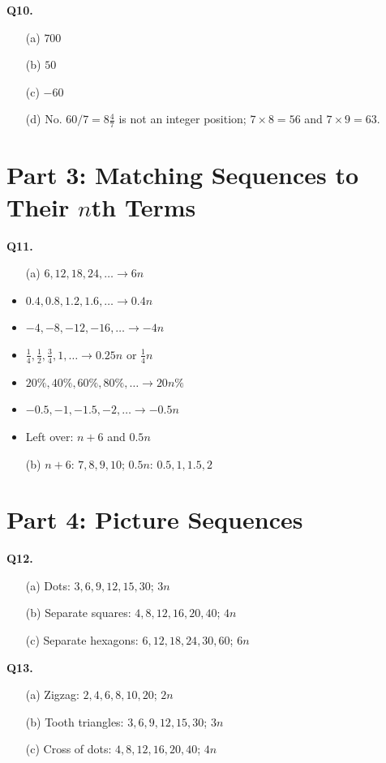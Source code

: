 \documentclass[11pt,a4paper]{article}
\begin{document}
\textbf{Q10.}
\begin{itemize}
\item[(a)] \(700\)
\item[(b)] \(50\)
\item[(c)] \(-60\)
\item[(d)] No. \(60/7=8\frac47\) is not an integer position; \(7\times8=56\) and \(7\times9=63\).
\end{itemize}

\section*{Part 3: Matching Sequences to Their \(n\)th Terms}

\textbf{Q11.}
\begin{itemize}
\item[(a)] \(6,12,18,24,\ldots\to 6n\)
\item \(0.4,0.8,1.2,1.6,\ldots\to 0.4n\)
\item \(-4,-8,-12,-16,\ldots\to -4n\)
\item \(\frac14,\frac12,\frac34,1,\ldots\to 0.25n\) or \(\frac14 n\)
\item \(20\%,40\%,60\%,80\%,\ldots\to 20n\%\)
\item \(-0.5,-1,-1.5,-2,\ldots\to -0.5n\)
\item Left over: \(n+6\) and \(0.5n\)
\item[(b)] \(n+6\): \(7,8,9,10\); \(0.5n\): \(0.5,1,1.5,2\)
\end{itemize}

\section*{Part 4: Picture Sequences}

\textbf{Q12.}
\begin{itemize}
\item[(a)] Dots: \(3,6,9,12,15,30\); \(3n\)
\item[(b)] Separate squares: \(4,8,12,16,20,40\); \(4n\)
\item[(c)] Separate hexagons: \(6,12,18,24,30,60\); \(6n\)
\end{itemize}

\textbf{Q13.}
\begin{itemize}
\item[(a)] Zigzag: \(2,4,6,8,10,20\); \(2n\)
\item[(b)] Tooth triangles: \(3,6,9,12,15,30\); \(3n\)
\item[(c)] Cross of dots: \(4,8,12,16,20,40\); \(4n\)
\end{itemize}
\end{document}
